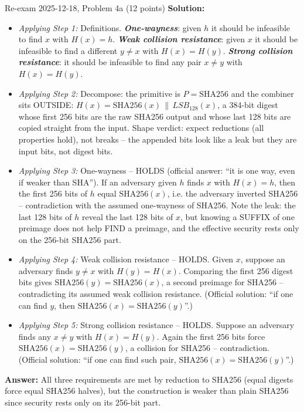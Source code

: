 \documentclass[12pt, a4paper]{article}
\newcommand{\term}[1]{\textbf{\textit{#1}}}        %
\begin{document}
\begin{practicebox}{Re-exam 2025-12-18, Problem 4a (12 points)}
\textbf{Solution:}
\begin{itemize}
    \item \textit{Applying Step 1:} Definitions. \term{One-wayness}: given $h$ it should be infeasible to find $x$ with $H(x) = h$. \term{Weak collision resistance}: given $x$ it should be infeasible to find a different $y \neq x$ with $H(x) = H(y)$. \term{Strong collision resistance}: it should be infeasible to find any pair $x \neq y$ with $H(x) = H(y)$.
    \item \textit{Applying Step 2:} Decompose: the primitive is $P = \mathrm{SHA256}$ and the combiner sits OUTSIDE: $H(x) = \mathrm{SHA256}(x) \,\|\, LSB_{128}(x)$, a 384-bit digest whose first 256 bits are the raw SHA256 output and whose last 128 bits are copied straight from the input. Shape verdict: expect reductions (all properties hold), not breaks -- the appended bits look like a leak but they are input bits, not digest bits.
    \item \textit{Applying Step 3:} One-wayness -- HOLDS (official answer: ``it is one way, even if weaker than SHA''). If an adversary given $h$ finds $x$ with $H(x) = h$, then the first 256 bits of $h$ equal $\mathrm{SHA256}(x)$, i.e. the adversary inverted SHA256 -- contradiction with the assumed one-wayness of SHA256. Note the leak: the last 128 bits of $h$ reveal the last 128 bits of $x$, but knowing a SUFFIX of one preimage does not help FIND a preimage, and the effective security rests only on the 256-bit SHA256 part.
    \item \textit{Applying Step 4:} Weak collision resistance -- HOLDS. Given $x$, suppose an adversary finds $y \neq x$ with $H(y) = H(x)$. Comparing the first 256 digest bits gives $\mathrm{SHA256}(y) = \mathrm{SHA256}(x)$, a second preimage for SHA256 -- contradicting its assumed weak collision resistance. (Official solution: ``if one can find $y$, then $\mathrm{SHA256}(x) = \mathrm{SHA256}(y)$''.)
    \item \textit{Applying Step 5:} Strong collision resistance -- HOLDS. Suppose an adversary finds any $x \neq y$ with $H(x) = H(y)$. Again the first 256 bits force $\mathrm{SHA256}(x) = \mathrm{SHA256}(y)$, a collision for SHA256 -- contradiction. (Official solution: ``if one can find such pair, $\mathrm{SHA256}(x) = \mathrm{SHA256}(y)$''.)
\end{itemize}
\textbf{Answer:} All three requirements are met by reduction to SHA256 (equal digests force equal SHA256 halves), but the construction is weaker than plain SHA256 since security rests only on its 256-bit part.
\end{practicebox}
\end{document}
